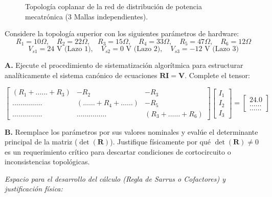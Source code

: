 \documentclass[11pt,a4paper]{article}
\begin{document}
\begin{figure}[h!]
    \centering
    \caption{Topología coplanar de la red de distribución de potencia mecatrónica (3 Mallas independientes).}
\end{figure}

Considere la topología superior con los siguientes parámetros de hardware:
$$R_1=10\Omega, \quad R_2=22\Omega, \quad R_3=15\Omega, \quad R_4=33\Omega, \quad R_5=47\Omega, \quad R_6=12\Omega$$
$$V_{s1} = 24\text{ V (Lazo 1)}, \quad V_{s2} = 0\text{ V (Lazo 2)}, \quad V_{s3} = -12\text{ V (Lazo 3)}$$

\textbf{A.} Ejecute el procedimiento de sistematización algorítmica para estructurar analíticamente el sistema canónico de ecuaciones $\mathbf{R}\mathbf{I} = \mathbf{V}$. Complete el tensor:

\vspace{0.5cm}

$$
\begin{bmatrix}
 (R_1 + \dots \dots + R_3) & -R_2 & -R_3 \\
 \dots \dots \dots \dots \dots & (\dots \dots + R_4 + \dots \dots) & -R_5 \\
 \dots \dots \dots \dots \dots & \dots \dots \dots \dots \dots & (R_3 + \dots \dots + R_6)
\end{bmatrix}
\begin{bmatrix}
 I_1 \\
 I_2 \\
 I_3
\end{bmatrix}
=
\begin{bmatrix}
 24.0 \\
 \dots \dots \\
 \dots \dots
\end{bmatrix}
$$

\vspace{0.5cm}

\textbf{B.} Reemplace los parámetros por sus valores nominales y evalúe el determinante principal de la matriz ($\det(\mathbf{R})$). Justifique físicamente por qué $\det(\mathbf{R}) \neq 0$ es un requerimiento crítico para descartar condiciones de cortocircuito o inconsistencias topológicas.

\vspace{0.3cm}
\begin{tcolorbox}[colback=white,colframe=UCBgray,height=6.5cm,valign=top]
\textit{Espacio para el desarrollo del cálculo (Regla de Sarrus o Cofactores) y justificación física:}
\end{tcolorbox}
\end{document}
